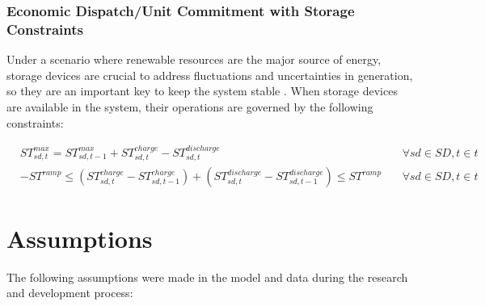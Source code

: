 \documentclass[12pt,LUDisStyle,twosided]{book}
\begin{document}
\subsubsection{Economic Dispatch/Unit Commitment with Storage Constraints}

Under a scenario where renewable resources are the major source of energy, storage devices are crucial to address fluctuations and uncertainties in generation, so they are an important key to keep the system stable \cite{dwyer}. When storage devices are available in the system, their operations are governed by the following constraints:

\begin{subequations}\label{model:storageConstraints}
\begin{alignat}{4}
& ST^{max}_{sd,t} = ST^{max}_{sd,t - 1} + ST^{charge}_{sd,t} - ST^{discharge}_{sd,t}  &~& \forall sd \in SD, t \in t \label{eq:storageLimits} \\
&  -ST^{ramp} \leq (ST^{charge}_{sd,t} - ST^{charge}_{sd,t-1}) + (ST^{discharge}_{sd,t} - ST^{discharge}_{sd,t-1}) \leq ST^{ramp}  &~& \forall sd \in SD, t \in t \label{eq:storageRamping}
\end{alignat} 
\end{subequations}


\section{Assumptions}

The following assumptions were made in the model and data during the research and development process:
\end{document}
